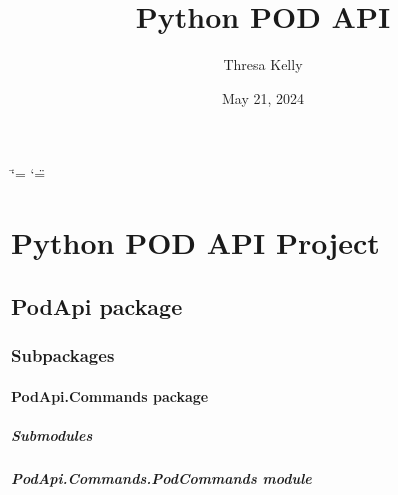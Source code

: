 \documentclass[letterpaper,10pt,english]{sphinxmanual}
\title{Python POD API}
\date{May 21, 2024}
\author{Thresa Kelly}
\begin{document}
\ifdefined\shorthandoff
  \ifnum\catcode`\=\string=\active\shorthandoff{=}\fi
  \ifnum\catcode`\"=\active{}\fi
\fi

\pagestyle{empty}
\sphinxmaketitle
\pagestyle{plain}
\sphinxtableofcontents
\pagestyle{normal}
\label{\detokenize{index::doc}}


\sphinxstepscope


\chapter{Python POD API Project}
\label{\detokenize{modules:python-pod-api-project}}\label{\detokenize{modules::doc}}
\sphinxstepscope


\section{PodApi package}
\label{\detokenize{PodApi:podapi-package}}\label{\detokenize{PodApi::doc}}

\subsection{Subpackages}
\label{\detokenize{PodApi:subpackages}}
\sphinxstepscope


\subsubsection{PodApi.Commands package}
\label{\detokenize{PodApi.Commands:podapi-commands-package}}\label{\detokenize{PodApi.Commands::doc}}

\paragraph{Submodules}
\label{\detokenize{PodApi.Commands:submodules}}

\paragraph{PodApi.Commands.PodCommands module}
\label{\detokenize{PodApi.Commands:module-PodApi.Commands.PodCommands}}\label{\detokenize{PodApi.Commands:podapi-commands-podcommands-module}}
\end{document}
